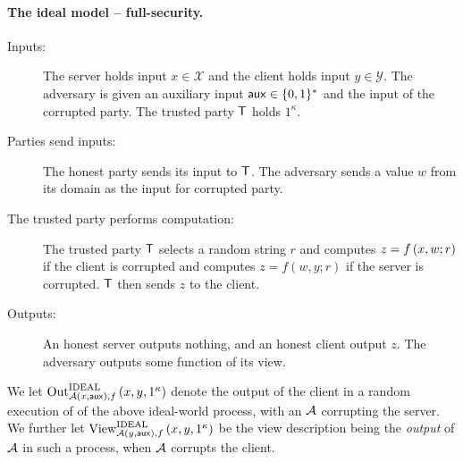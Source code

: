 \documentclass{llncs}
\newcommand{\X}{\mathcal{X}}
\newcommand{\Y}{\mathcal{Y}}
\newcommand{\aux}{\mathsf{aux}}
\newcommand{\IDEAL}{\operatorname{IDEAL}}
\newcommand{\Out}{\operatorname{Out}}
\newcommand{\View}{\operatorname{View}}
\begin{document}
\paragraph{The ideal model -- full-security.}
\begin{description}

\item[Inputs:] The server holds input $x\in\X$ and the client holds input $y\in\Y$. The adversary is given an auxiliary input $\aux\in\zo^{*}$ and the input of the corrupted party. The trusted party $\mathsf{T}$ holds $1^{\kappa}$.

\item[Parties send inputs:] The honest party sends its input to $\mathsf{T}$. The adversary sends a value $w$ from its domain as the input for corrupted party.

\item[The trusted party performs computation:] 
The trusted party $\mathsf{T}$ selects a random string $r$ and computes $z=f\left ( x,w;r \right )$ if the client is corrupted and  computes $z=f(w,y;r)$ if the server is corrupted. $\mathsf{T}$ then sends $z$ to the client.

\item[Outputs:] An honest server outputs nothing, and an honest client output $z$. The adversary outputs some function of its view.
\end{description}

We let $\Out^{\IDEAL}_{\adv\of{x,\aux},f}\of{x,y,1^{\kappa}}$ denote the output of the client in a random execution of of the above ideal-world process, with an $\mathcal{A}$ corrupting the server. We further let $\View^{\IDEAL}_{\adv\of{y,\aux},f}\of{x,y,1^{\kappa}}$ be the view description being the \emph{output} of $\mathcal{A}$ in such a process, when $\mathcal{A}$ corrupts the client.
\end{document}
